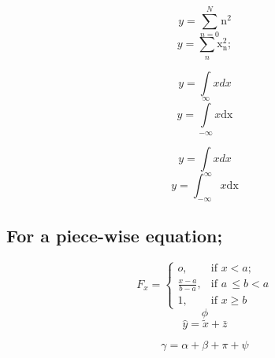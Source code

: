 \documentclass[a4paper, 12pt]{article}
\begin{document}
		$$y=\sum_{n=0}^{N} \mathrm{n^2} $$	
		$$y = \sum_{n} \mathrm{x^{2}_{n}};$$
		
		$$y =\int xdx$$
			$$y = \int\limits_{-\infty}^{\infty} x\mathrm{dx}$$
			
		$$y =\int xdx$$
		$$y = \int_{-\infty}^{\infty} x\mathrm{dx}$$	
		\subsection*{For a piece-wise equation;}
	\Large{	\[F_x=
		\begin{cases}
			o, & \text{if} \,\, x < a;\\
			\frac{x-a}{b-a}, & \text{if} \,\, a \,\leq  b<a\\
			1, & \text{if}\,\, x\geq b
			\end{cases}
		 \]	
	}	
	$$\phi$$
	\[\hat{y}=\tilde{x}+ \bar{z}\]
	
	\[\gamma= \alpha + \beta + \pi +\psi \]
\end{document}

